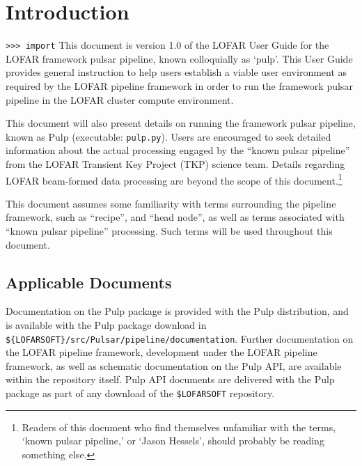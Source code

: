 \documentclass[a4paper,10pt,bibtotoc]{scrartcl}
\begin{document}
\section{Introduction}
\label{sec:introduction}
\verb|>>> import| This document is version 1.0 of the LOFAR User Guide for the LOFAR
framework pulsar pipeline, known colloquially as `pulp'.  This User
Guide provides general instruction to help users establish a viable user environment
as required by the LOFAR pipeline framework in order to run
the framework pulsar pipeline in the LOFAR cluster compute environment.

This document will also present details on running the
framework pulsar pipeline, known as Pulp (executable: \verb|pulp.py|).
Users are encouraged to seek detailed information about the
actual processing engaged by the ``known pulsar pipeline'' from the
LOFAR Transient Key Project (TKP) science team. Details
regarding LOFAR beam-formed data processing are beyond the scope of this
document.\footnote{Readers of this
  document who find themselves unfamiliar with the terms, `known pulsar
  pipeline,'  or `Jason Hessels', should probably be reading something else.}

This document assumes some familiarity with terms surrounding the pipeline
framework, such as ``recipe'',  and ``head node'', as well as terms
associated with ``known pulsar pipeline'' processing. Such terms will
be used throughout this document.

\subsection{Applicable Documents}
Documentation on the Pulp package is provided with the Pulp
distribution, and is available with the Pulp package download in
\verb|${LOFARSOFT}/src/Pulsar/pipeline/documentation|. 
Further documentation on the LOFAR pipeline framework, development
under the LOFAR pipeline framework,  as well as schematic
documentation on the Pulp API,  are available  within the repository
itself.  Pulp API documents are delivered with the Pulp package as
part of any download of the \verb|$LOFARSOFT| repository.
\end{document}
